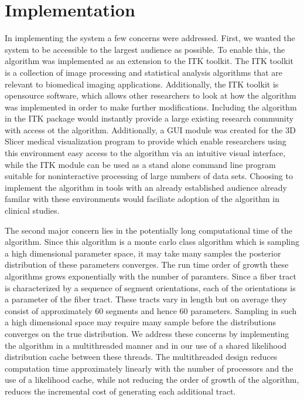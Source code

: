 \chapter{Implementation}
In implementing the system a few concerns were addressed.  First, we wanted the system to be accessible to the largest audience as possible.  To enable this, the algorithm was implemented as an extension to the ITK toolkit.  The ITK toolkit is a collection of image processing and statistical analysis algorithms that are relevant to biomedical imaging applications.  Additionally, the ITK toolkit is opensource software, which allows other researchers to look at how the algorithm was implemented in order to make further modifications.  Including the algorithm in the ITK package would instantly provide a large existing research community with access ot the algorithm.  Additionally, a GUI module was created for the 3D Slicer medical visualization program to provide which enable researchers using this environment easy access to the algorithm via an intuitive visual interface, while the ITK module can be used as a stand alone command line program suitable for noninteractive processing of large numbers of data sets.  Choosing to implement the algorithm in tools with an already established audience already familar with these environments would faciliate adoption of the algorithm in clinical studies.

The second major concern lies in the potentially long computational time of the algorithm.  Since this algorithm is a monte carlo class algorithm which is sampling a high dimensional parameter space, it may take many samples the posterior distribution of these parameters converges.  The run time order of growth these algorithms grows exponentially with the number of paramters.  Since a fiber tract is characterized by a sequence of segment orientations, each of the orientations is a parameter of the fiber tract.  These tracts vary in length but on average they consist of approximately 60 segments and hence 60 parameters.  Sampling in such a high dimensional space may require many sample before the distributions converges on the true distribution.  We address these concerns by implementing the algorithm in a multithreaded manner and in our use of a shared likelihood distribution cache between these threads.  The multithreaded design reduces computation time approximately linearly with the number of processors and the use of a likelihood cache, while not reducing the order of growth of the algorithm, reduces the incremental cost of generating each additional tract.

